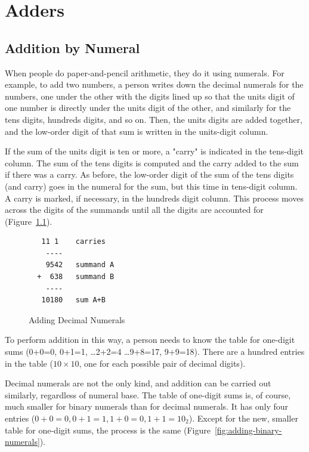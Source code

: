 \chapter{Adders}
\label{ch:adders}


\section{Addition by Numeral}
\label{sec:addition-by-numeral}

When people do paper-and-pencil arithmetic,
they do it using numerals.
For example, to add two numbers, a person
writes down the decimal numerals for the numbers,
one under the other with the digits lined up so that
the units digit of one number is directly under
the units digit of the other, and similarly for
the tens digits, hundreds digits, and so on.
Then, the units digits are added together,
and the low-order digit of that sum is written
in the units-digit column.

If the sum of the units digit is ten or more,
a "carry" is indicated in the tens-digit column.
The sum of the tens digits is computed and the
carry added to the sum if there was a carry.
As before, the low-order digit of the sum of the
tens digits (and carry) goes in the numeral for the sum,
but this time in tens-digit column.
A carry is marked, if necessary,
in the hundreds digit column.
This process moves across the digits of the summands until all the digits
are accounted for (Figure~\ref{fig:adding-decimal-numerals}).

\begin{figure}
\begin{lstlisting}
   11 1    carries
    ----
    9542   summand A
  +  638   summand B
    ----
   10180   sum A+B
\end{lstlisting}
\caption{Adding Decimal Numerals}
\label{fig:adding-decimal-numerals}
\end{figure}

To perform addition in this way, a person needs to know
the table for one-digit sums (0+0=0, 0+1=1, \dots 2+2=4 \dots 9+8=17, 9+9=18).
There are a hundred entries in the table ($10 \times 10$, one for each
possible pair of decimal digits).

Decimal numerals are not the only kind,
and addition can be carried out similarly, regardless of numeral base.
The table of one-digit sums is, of course, much smaller for binary numerals
than for decimal numerals.
It has only four entries ($0+0=0, 0+1=1, 1+0=0, 1+1=10_2$).
Except for the new, smaller table for one-digit sums,
the process is the same (Figure~\ref{fig:adding-binary-numerals}).

